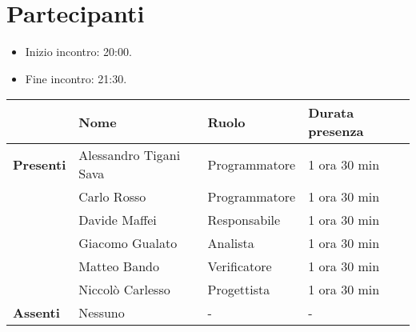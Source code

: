 \section*{Partecipanti}

\begin{itemize}
	\item Inizio incontro: 20:00.
	\item Fine incontro: 21:30.
\end{itemize}


\begin{center}
	\begin{tabular}{llll}
		                  & \textbf{Nome}          & \textbf{Ruolo} & \textbf{Durata presenza} \\
		\hline
		\textbf{Presenti} & Alessandro Tigani Sava & Programmatore  & 1 ora 30 min             \\
		                  & Carlo Rosso            & Programmatore  & 1 ora 30 min             \\
		                  & Davide Maffei          & Responsabile   & 1 ora 30 min             \\
		                  & Giacomo Gualato        & Analista       & 1 ora 30 min             \\
		                  & Matteo Bando           & Verificatore   & 1 ora 30 min             \\
		                  & Niccolò Carlesso       & Progettista    & 1 ora 30 min             \\
		\hline
		\textbf{Assenti}  & Nessuno                & -              & -                        \\
	\end{tabular}
\end{center}
